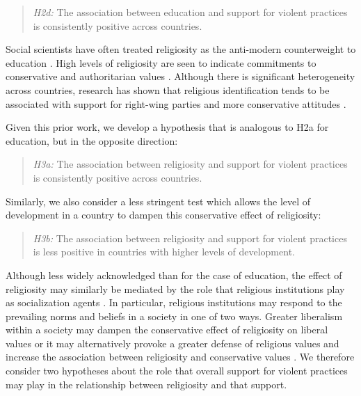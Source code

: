 \documentclass[10pt,letterpaper]{article}
\begin{document}
\begin{quote}
\emph{H2d:} The association between education and support for violent practices is consistently positive across countries.
\end{quote}

Social scientists have often treated religiosity as the anti-modern counterweight to education \cite{schwadel_explaining_2015}. High levels of religiosity are seen to indicate commitments to conservative and authoritarian values \cite{rokeach_part_1969, rokeach_part_1969a, wilcox_evangelicals_1990}. Although there is significant heterogeneity across countries, research has shown that religious identification tends to be associated with support for right-wing parties and more conservative attitudes \cite{wilcox_evangelicals_1990, kelley_class_1995, scheepers_religion_1998, karpov_religiosity_2002, norris_sacred_2011}.

Given this prior work, we develop a hypothesis that is analogous to H2a for education, but in the opposite direction:

\begin{quote}
\emph{H3a:} The association between religiosity and support for violent practices is consistently positive across countries.
\end{quote}

Similarly, we also consider a less stringent test which allows the level of development in a country to dampen this conservative effect of religiosity:

\begin{quote}
\emph{H3b:} The association between religiosity and support for violent practices is less positive in countries with higher levels of development.
\end{quote}

Although less widely acknowledged than for the case of education, the effect of religiosity may similarly be mediated by the role that religious institutions play as socialization agents \cite{scheepers_education_2002}. In particular, religious institutions may respond to the prevailing norms and beliefs in a society in one of two ways. Greater liberalism within a society may dampen the conservative effect of religiosity on liberal values or it may alternatively provoke a greater defense of religious values and increase the association between religiosity and conservative values \cite{kelley_national_1997}. We therefore consider two hypotheses about the role that overall support for violent practices may play in the relationship between religiosity and that support.
\end{document}
